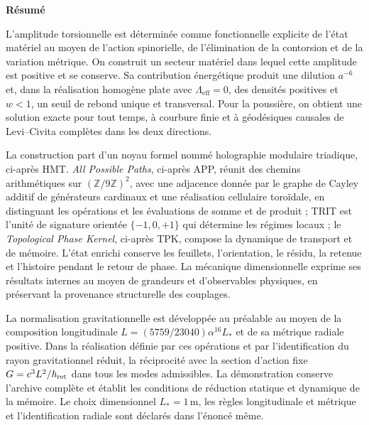 
\begin{center}\bfseries Résumé\end{center}
\begingroup
\fontsize{9.5}{10.7}\selectfont
\setlength{\parskip}{1.5pt plus .5pt minus .5pt}
\noindent
L'amplitude torsionnelle est déterminée comme fonctionnelle explicite de l'état matériel au moyen de l'action spinorielle, de l'élimination de la contorsion et de la variation métrique. On construit un secteur matériel dans lequel cette amplitude est positive et se conserve. Sa contribution énergétique produit une dilution \(a^{-6}\) et, dans la réalisation homogène plate avec \(\Lambda_{\mathrm{eff}}=0\), des densités positives et \(w<1\), un seuil de rebond unique et transversal. Pour la poussière, on obtient une solution exacte pour tout temps, à courbure finie et à géodésiques causales de Levi--Civita complètes dans les deux directions.

La construction part d'un noyau formel nommé holographie modulaire
triadique, ci-après HMT. \emph{All Possible Paths}, ci-après APP,
réunit des chemins arithmétiques sur \((\mathbb Z/9\mathbb Z)^2\), avec une
adjacence donnée par le graphe de Cayley additif de générateurs cardinaux
et une réalisation cellulaire toroïdale, en distinguant les opérations et les
évaluations de somme et de produit ;
TRIT est l'unité de signature orientée \(\{-1,0,+1\}\) qui détermine les
régimes locaux ; le \emph{Topological Phase Kernel}, ci-après TPK,
compose la dynamique de transport et de mémoire. L'état enrichi
conserve les feuillets, l'orientation, le résidu, la retenue et l'histoire pendant le
retour de phase. La mécanique dimensionnelle exprime ses résultats
internes au moyen de grandeurs et d'observables physiques, en préservant la
provenance structurelle des couplages.

La normalisation gravitationnelle est développée au préalable au moyen de la
composition longitudinale \(L=(5759/23040)\alpha^{16}L_*\) et de sa
métrique radiale positive. Dans la réalisation définie par ces opérations
et par l'identification du rayon gravitationnel réduit, la réciprocité
avec la section d'action fixe \(G=c^3L^2/\hbar_{\rm ret}\) dans tous
les modes admissibles. La démonstration conserve l'archive complète et
établit les conditions de réduction statique et dynamique de la mémoire.
Le choix dimensionnel \(L_*=1\,\mathrm m\), les règles longitudinale
et métrique et l'identification radiale sont déclarés dans l'énoncé même.

